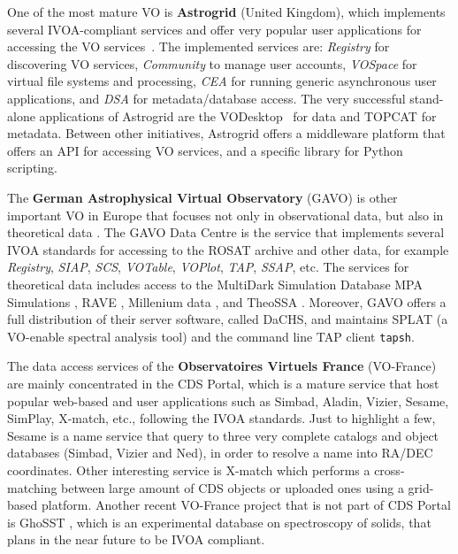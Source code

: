 One of the most mature VO is \textbf{Astrogrid} (United Kingdom), which implements
several IVOA-compliant services and offer very popular user applications
for accessing the VO services~\cite{}.
The implemented services are: \emph{Registry}
for discovering VO services, \emph{Community} to manage user accounts, 
\emph{VOSpace} for virtual file systems and processing, \emph{CEA} for running
generic asynchronous user applications, and \emph{DSA} for metadata/database
access. The very successful stand-alone applications of Astrogrid are 
the VODesktop~\cite{} for data and
TOPCAT \cite{} for metadata.
Between other initiatives, Astrogrid offers a middleware platform 
that offers an API for accessing VO services, and a specific 
library for Python scripting.

The \textbf{German Astrophysical Virtual Observatory} (GAVO) is other important VO in Europe that focuses not
only in observational data, but also in theoretical data \cite{}.
The GAVO Data Centre is the service that implements several IVOA standards for 
accessing to the ROSAT archive and other data, for example 
\emph{Registry}, \emph{SIAP}, \emph{SCS}, \emph{VOTable}, \emph{VOPlot}, 
\emph{TAP}, \emph{SSAP}, etc. The services for 
theoretical data includes access to the MultiDark Simulation Database \cite{}
MPA Simulations \cite{},
RAVE \cite{},
Millenium data \cite{},
and TheoSSA \cite{}.
Moreover, GAVO offers a full distribution of their server software, called
DaCHS, and maintains SPLAT (a VO-enable spectral analysis tool) and the command line TAP
client \texttt{tapsh}.


The data access services of the \textbf{Observatoires Virtuels France}
(VO-France) are mainly concentrated in the 
CDS Portal, which is a mature service that host popular web-based and
user applications such as Simbad, Aladin, Vizier, Sesame, SimPlay, X-match,
etc., following the IVOA standards. 
Just to highlight a few, Sesame is a name service that query to 
three very complete catalogs and object databases (Simbad, Vizier and Ned),
in order to resolve a name into RA/DEC coordinates. Other interesting 
service is X-match which performs a cross-matching between large amount
of CDS objects or uploaded ones using a grid-based platform.
Another recent VO-France project that is not part of CDS Portal 
is GhoSST \cite{},
which is an experimental database on spectroscopy of solids, that
plans in the near future to be IVOA compliant.

